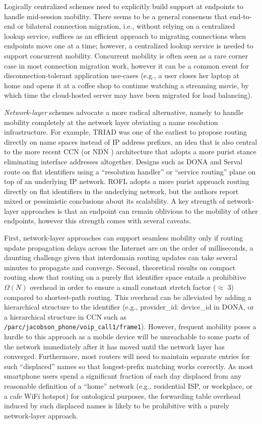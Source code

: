{Logically centralized schemes need to explicitly build support at endpoints to handle mid-session mobility. There seems to be a general consensus \cite{Migrate,ECCP,TCP-R} that end-to-end or bilateral connection migration, i.e., without relying on a centralized lookup service, suffices as an efficient approach to migrating connections when endpoints move one at a time; however, a centralized lookup service is needed to support concurrent mobility. Concurrent mobility is often seen as a rare corner case in most connection migration work, however it can be a common event for disconnection-tolerant application use-cases (e.g., a user closes her laptop at home and opens it at a coffee shop to continue watching a streaming movie, by which time the cloud-hosted server may have been migrated for load balancing).

{\em Network-layer} schemes advocate a more radical alternative, namely to handle mobility completely at the network layer obviating a name resolution infrastructure. For example, TRIAD \cite{TRIAD} was one of the earliest to propose routing directly on name spaces instead of IP address prefixes, an idea that is also central to the more recent CCN \cite{CCN} (or NDN \cite{NDN}) architecture that adopts a more purist stance eliminating interface addresses altogether. Designs such as DONA \cite{DONA} and Serval \cite{serval} route on flat identifiers using a ``resolution handler'' or ``service routing'' plane on top of an underlying IP network. ROFL \cite{ROFL} adopts a more purist approach routing directly on flat identifiers in the underlying network, but the authors report mixed or pessimistic conclusions about its scalability. A key strength of network-layer approaches is that an endpoint can remain oblivious to the mobility of other endpoints, however this strength comes with several caveats.

First, network-layer approaches can support seamless mobility only if routing update propagation delays across the Internet are on the order of milliseconds, a daunting challenge given that interdomain routing updates can take several minutes to propagate and converge. Second, theoretical results on compact routing show that routing on a purely flat identifier space entails a prohibitive $\Omega(N)$ overhead in order to ensure a small constant stretch factor ($\approx$ 3) compared to shortest-path routing.  This overhead can be alleviated by adding a hierarchical structure to the identifier (e.g., provider\_id: device\_id in DONA, or a hierarchical structure in CCN such as  \verb+/parc/jacobson_phone/voip_call1/frame1+). However, frequent mobility poses a hurdle to this approach as a mobile device will be unreachable to some parts of the network immediately after it has moved until the network layer has converged. Furthermore, most routers will need to maintain separate entries for such ``displaced'' names so that longest-prefix matching works correctly. As most smartphone users spend a significant fraction of each day displaced from any reasonable definition of a ``home'' network (e.g., residential ISP, or workplace, or a cafe WiFi hotspot) for ontological purposes, the forwarding table overhead induced by such displaced names is likely to be prohibitive with a purely network-layer approach.

}
